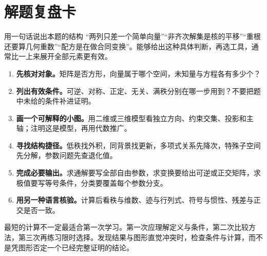 \chapter*{解题复盘卡}
\begin{insight}{用一句话说出本题的结构}
“两列只差一个简单向量”“非齐次解集是核的平移”“重根还要算几何重数”“配方是在做合同变换”。能够给出这种具体判断，再选工具，通常比一上来展开全部元素更有效。
\end{insight}
\begin{enumerate}
\item \textbf{先核对对象。}矩阵是否方形，向量属于哪个空间，未知量与方程各有多少个？
\item \textbf{列出有效条件。}可逆、对称、正定、无关、满秩分别在哪一步用到？不要把题中未给的条件补进证明。
\item \textbf{画一个可解释的小图。}用二维或三维模型看独立方向、约束交集、投影和主轴；注明这是模型，再用代数推广。
\item \textbf{寻找结构捷径。}低秩找外积，同背景找更新，多项式关系先降次，特殊子空间先分解，参数问题先查退化值。
\item \textbf{完成必要输出。}求通解要写全部自由参数，求变换要给出可逆或正交矩阵，求极值要写等号条件，分类要覆盖每个参数分支。
\item \textbf{用另一种语言核验。}计算后看秩与维数、迹与行列式、符号与惯性、残差与正交是否一致。
\end{enumerate}
\begin{warning}
最短的计算不一定最适合第一次学习。第一次应理解定义与条件，第二次比较方法，第三次再练习限时选择。发现结果与图形直觉冲突时，检查条件与计算，而不是凭图形否定一个已经完整证明的结论。
\end{warning}
